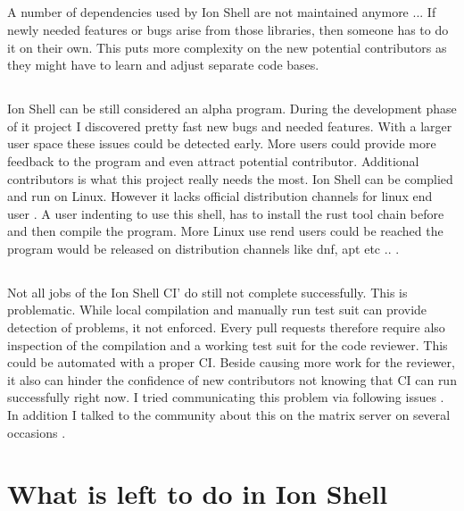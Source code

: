 \subsection{\itemIonShellDependencies}

A number of dependencies used by Ion Shell are not maintained anymore ... If newly needed features or bugs arise from those libraries, then someone has to do it on their own.
This puts more complexity on the new potential contributors as they might have to learn and adjust separate code bases.

\subsection{\itemIonShellDistribution}

Ion Shell can be still considered an alpha program.
During the development phase of it project I discovered pretty fast new bugs and needed features.
With a larger user space these issues could be detected early.
More users could provide more feedback to the program and even attract potential contributor.
Additional contributors is what this project really needs the most.
Ion Shell can be complied and run on Linux.
However it lacks official distribution channels for linux end user .
A user indenting to use this shell, has to install the rust tool chain before and then compile the program.
More Linux use rend users could be reached the program would be released on distribution channels like dnf, apt etc .. .

\subsection{\itemIonShellCI}\label{section:ci_ion_shell}

Not all jobs of the Ion Shell CI' do still not complete successfully.
This is problematic. While local compilation and manually
run test suit can provide detection of problems, it not enforced.
Every pull requests therefore require also inspection of the compilation
and a working test suit for the code reviewer.
This could be automated with a proper CI.
Beside causing more work for the reviewer, it also can hinder
the confidence of new contributors not knowing that CI can run successfully right now.
I tried communicating this problem via following issues \cite{issue_ci_linux_stable_fail}.
In addition I talked to the community
about this on the matrix server on several occasions \cite{matrix_channel}.

\section{What is left to do in Ion Shell}

